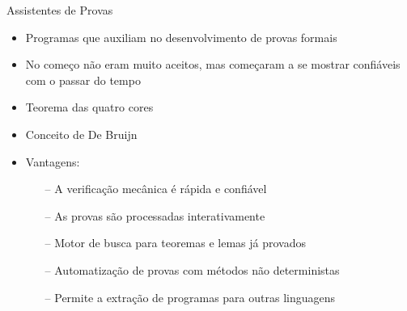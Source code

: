 \begin{frame}{Assistentes de Provas}
    \begin{itemize}
        \item Programas que auxiliam no desenvolvimento de provas formais \cite{silva2019certificaccao}
        \item No começo não eram muito aceitos, mas começaram a se mostrar confiáveis com o passar do tempo \cite{geuvers2009proof}
        \item Teorema das quatro cores
        \item Conceito de De Bruijn \cite{barendregt2001proof}
        \item Vantagens:
        \begin{itemize}
            \item [--] A verificação mecânica é rápida e confiável
            \item [--] As provas são processadas interativamente
            \item [--] Motor de busca para teoremas e lemas já provados
            \item [--] Automatização de provas com métodos não deterministas
            \item [--] Permite a extração de programas para outras linguagens
        \end{itemize}
    \end{itemize}
\end{frame}